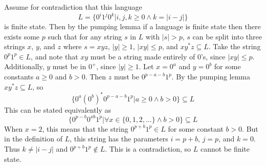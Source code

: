 \documentclass[12pt]{article}
\begin{document}
Assume for contradiction that this language
\[L=\{0^i1^j0^k | i,j,k\geq0 \wedge k=|i-j|\}\]
is finite state. Then by the pumping lemma if a language is finite state then there exists some \(p\) such that for any string \(s\) in
\(L\) with \(|s|>p\), \(s\) can be split into three strings \(x\), \(y\), and \(z\) where \(s=xyz\), \(|y|\geq 1\), \(|xy|\leq p\), and \(xy^*z\subseteq L\).
Take the string \(0^p1^p\in L\), and note that \(xy\) must be a string made entirely of \(0\)'s, since \(|xy|\leq p\). Additionally, \(y\) must be in \(0^+\),
since \(|y|\geq 1\). Let \(x=0^a\) and \(y=0^b\) for some constants \(a\geq 0\) and \(b>0\). Then \(z\) must be \(0^{p-a-b}1^p\). By the pumping lemma \(xy^*z\subseteq L\),
so
\[\{0^a(0^b)^*0^{p-a-b}1^p|a\geq0 \wedge b>0\}\subseteq L\]
This can be stated equivalently as
\[\{0^{p-b}0^{xb}1^p|\forall x\in\{0,1,2,\ldots\} \wedge b>0\}\subseteq L\]
When \(x=2\), this means that the string \(0^{p+b}1^p\in L\) for some constant \(b>0\). But in the definition of \(L\), this string has the parameters
\(i=p+b\), \(j=p\), and \(k=0\). Thus \(k\neq |i-j|\) and \(0^{p+b}1^p\notin L\). This is a contradiction, so \(L\) cannot be finite state.
\end{document}
